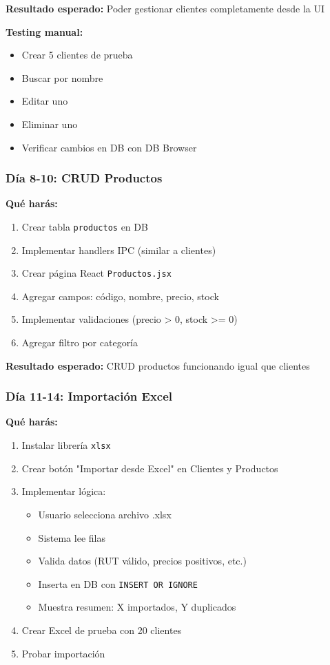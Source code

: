 \documentclass[11pt,a4paper]{article}
\begin{document}
\textbf{Resultado esperado:} Poder gestionar clientes completamente desde la UI

\textbf{Testing manual:}
\begin{itemize}
    \item Crear 5 clientes de prueba
    \item Buscar por nombre
    \item Editar uno
    \item Eliminar uno
    \item Verificar cambios en DB con DB Browser
\end{itemize}

\subsubsection{Día 8-10: CRUD Productos}

\textbf{Qué harás:}
\begin{enumerate}
    \item Crear tabla \texttt{productos} en DB
    \item Implementar handlers IPC (similar a clientes)
    \item Crear página React \texttt{Productos.jsx}
    \item Agregar campos: código, nombre, precio, stock
    \item Implementar validaciones (precio > 0, stock >= 0)
    \item Agregar filtro por categoría
\end{enumerate}

\textbf{Resultado esperado:} CRUD productos funcionando igual que clientes

\subsubsection{Día 11-14: Importación Excel}

\textbf{Qué harás:}
\begin{enumerate}
    \item Instalar librería \texttt{xlsx}
    \item Crear botón "Importar desde Excel" en Clientes y Productos
    \item Implementar lógica:
    \begin{itemize}
        \item Usuario selecciona archivo .xlsx
        \item Sistema lee filas
        \item Valida datos (RUT válido, precios positivos, etc.)
        \item Inserta en DB con \texttt{INSERT OR IGNORE}
        \item Muestra resumen: X importados, Y duplicados
    \end{itemize}
    \item Crear Excel de prueba con 20 clientes
    \item Probar importación
\end{enumerate}
\end{document}
